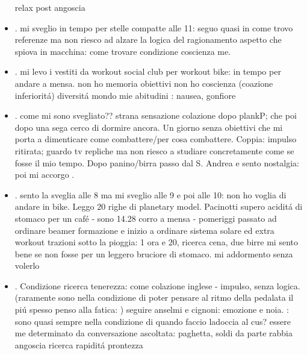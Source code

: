 \begin{itemize}
relax post angoscia
\item {}.
mi sveglio in tempo per stelle compatte alle 11: seguo quasi in come 
trovo referenze ma non riesco ad alzare la logica del ragionamento
aspetto che spiova in macchina: come trovare condizione coscienza me.
\item {}.
mi levo i vestiti da workout social club per workout bike: in tempo per andare a mensa.
non ho memoria obiettivi
non ho coscienza (coazione inferiorit\'a) diversit\'a mondo mie abitudini
: nausea, gonfiore
\item {}.
come mi sono svegliato??
strana sensazione colazione dopo plankP; che poi dopo una sega cerco di dormire ancora. Un giorno senza obiettivi che mi porta a dimenticare come combattere/per cosa combattere.
Coppia: impulso ritirata; guardo tv repliche ma non riesco a studiare concretamente come se fosse il mio tempo.
Dopo panino/birra passo dal S. Andrea e sento nostalgia: poi mi accorgo .
\item {}.
sento la sveglia alle 8 ma mi sveglio alle 9 e poi alle 10: non ho voglia di andare in bike. Leggo 20 righe di planetary model.
Pacinotti supero acidit\'a di stomaco per un caf\'e - sono 14.28 corro a mensa - pomeriggi passato ad ordinare beamer formazione e inizio a ordinare sistema solare ed extra
workout trazioni sotto la pioggia: 1 ora e 20, ricerca cena, due birre mi sento bene se non fosse per un leggero bruciore di stomaco.
mi addormento senza volerlo
\item {}.
Condizione ricerca tenerezza: come colazione inglese - impulso, senza logica.
(raramente sono nella condizione di poter pensare al ritmo della pedalata il pi\'u spesso penso alla fatica: )
seguire anselmi e cignoni: emozione e noia.
: sono quasi sempre nella condizione di quando faccio ladoccia al cus?
essere me determinato da conversazione ascoltata: paghetta, soldi da parte
rabbia angoscia ricerca rapidit\'a prontezza 

\end{itemize}
